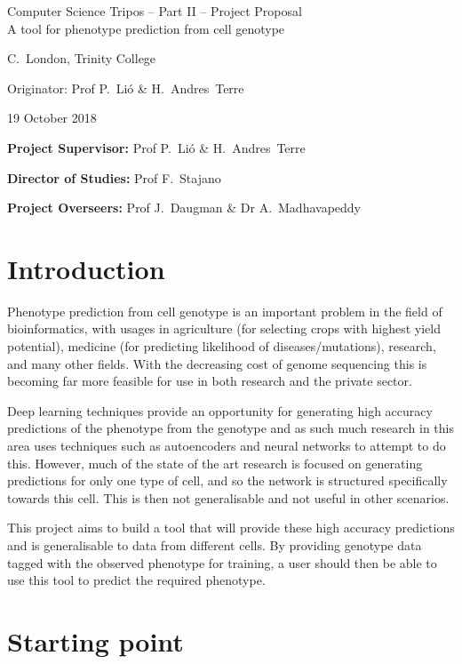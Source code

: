 \documentclass[12pt,a4paper,twoside,openany]{article}
\begin{document}
\begin{center}
\Large
Computer Science Tripos -- Part II -- Project Proposal\\[4mm]
\LARGE
A tool for phenotype prediction from cell genotype

\large
C.~London, Trinity College

Originator: Prof P.~Li\'o \& H.~Andres~Terre

19 October 2018
\end{center}

\vspace{5mm}

\textbf{Project Supervisor:} Prof P.~Li\'o \& H.~Andres~Terre

\textbf{Director of Studies:} Prof F.~Stajano

\textbf{Project Overseers:} Prof J.~Daugman  \& Dr A.~Madhavapeddy


\section*{Introduction}

Phenotype prediction from cell genotype is an important problem in the field of bioinformatics, with usages in agriculture (for selecting crops with highest yield potential), medicine (for predicting likelihood of diseases/mutations), research, and many other fields. With the decreasing cost of genome sequencing this is becoming far more feasible for use in both research and the private sector.

Deep learning techniques provide an opportunity for generating high accuracy predictions of the phenotype from the genotype and as such much research in this area uses techniques such as autoencoders and neural networks to attempt to do this. However, much of the state of the art research is focused on generating predictions for only one type of cell, and so the network is structured specifically towards this cell. This is then not generalisable and not useful in other scenarios.

This project aims to build a tool that will provide these high accuracy predictions and is generalisable to data from different cells. By providing genotype data tagged with the observed phenotype for training, a user should then be able to use this tool to predict the required phenotype.

\section*{Starting point}
\end{document}
